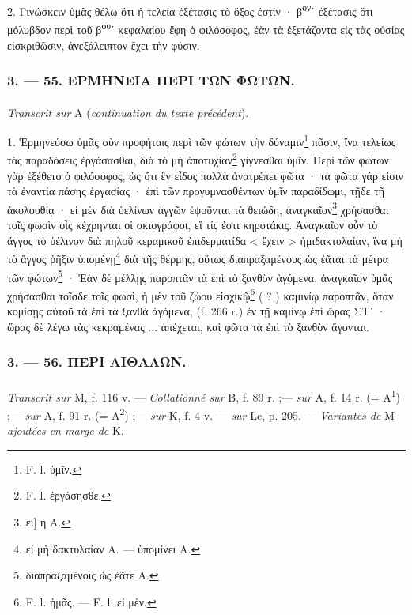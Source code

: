 \documentclass[a4paper, 11pt, oneside, polutonikogreek, french]{article}
\begin{document}
2. Γινώσκειν ὑμᾶς θέλω ὅτι ἡ τελεία ἐξέτασις τὸ ὄξος ἐστίν · β\textsuperscript{ον}ʹ ἐξέτασις ὅτι μόλυβδον περὶ τοῦ β\textsuperscript{ου}ʹ κεφαλαίου ἔφη ὁ φιλόσοφος, ἐὰν τὰ ἐξετάζοντα εἰς τὰς οὐσίας εἰσκριθῶσιν, ἀνεξάλειπτον ἔχει τὴν φύσιν.

\bigskip
\centerline{\EightStarTaper}
\centerline{\EightStarTaper\EightStarTaper}
\bigskip

\subsubsection{3. --- 55. ΕΡΜΗΝΕΙΑ ΠΕΡΙ ΤΩΝ ΦΩΤΩΝ.}
\paragraph{}
\emph{Transcrit sur} A (\emph{continuation du texte précédent}).

\bigskip

1. Ἑρμηνεύσω ὑμᾶς σὺν προφήταις περὶ τῶν φώτων τὴν δύναμιν\footnote{F. l. ὑμῖν.} πᾶσιν, ἵνα τελείως τὰς παραδόσεις ἐργάσασθαι, διὰ τὸ μὴ ἀποτυχίαν\footnote{F. l. ἐργάσησθε.} γίγνεσθαι ὑμῖν. Περὶ τῶν φώτων γὰρ ἐξέθετο ὁ φιλόσοφος, ὡς ὅτι ἓν εἶδος πολλὰ ἀνατρέπει φῶτα · τὰ φῶτα γάρ εἰσιν τὰ ἐναντία πάσης ἐργασίας · ἐπὶ τῶν προγυμνασθέντων ὑμῖν παραδίδωμι, τῇδε τῇ ἀκολουθίᾳ · εἰ μὲν διὰ ὑελίνων ἀγγῶν ἑψοῦνται τὰ θειώδη, ἀναγκαῖον\footnote{εἰ] ἡ A.} χρήσασθαι τοῖς φωσὶν οἷς κέχρηνται οἱ σκιογράφοι, εἴ τίς ἐστι κηροτάκις. Ἀναγκαῖον οὖν τὸ ἄγγος τὸ ὑέλινον διὰ πηλοῦ κεραμικοῦ ἐπιδερματίδα < ἔχειν > ἡμιδακτυλαίαν, ἵνα μὴ τὸ ἄγγος ῥῆξιν ὑπομένῃ\footnote{εἰ μὴ δακτυλαίαν A. --- ὑπομίνει A.} διὰ τῆς θέρμης, οὕτως διαπραξαμένους ὡς ἐᾶται τὰ μέτρα τῶν φώτων\footnote{διαπραξαμένοις ὡς ἐᾶτε A.} · Ἐὰν δὲ μέλλῃς παροπτᾶν τὰ ἐπὶ τὸ ξανθὸν ἀγόμενα, ἀναγκαῖον ὑμᾶς χρήσασθαι τοῖσδε τοῖς φωσὶ, ἡ μὲν τοῦ ζώου εἰσχικῷ\footnote{F. l. ἡμᾶς. --- F. l. εἰ μὲν.} ( ? ) καμινίῳ παροπτᾶν, ὅταν κομίσῃς αὐτοῦ τὰ ἐπὶ τὰ ξανθὰ ἀγόμενα, (f. 266 r.) ἐν τῇ καμίνῳ ἐπὶ ὥρας ΣΤʹ · ὥρας δὲ λέγω τὰς κεκραμένας ... ἀπέχεται, καὶ φῶτα τὰ ἐπὶ τὸ ξανθὸν ἄγονται.

\bigskip
\centerline{\EightStarTaper}
\centerline{\EightStarTaper\EightStarTaper}
\bigskip

\subsubsection{3. --- 56. ΠΕΡΙ ΑΙΘΑΛΩΝ.}
\paragraph{}
\emph{Transcrit sur} M, f. 116 v. --- \emph{Collationné sur} B, f. 89 r. ;--- \emph{sur} A, f. 14 r. (= A\textsuperscript{1}) ;--- \emph{sur} A, f. 91 r. (= A\textsuperscript{2}) ;--- \emph{sur} Κ, f. 4 v. --- \emph{sur} Lc, p. 205. --- \emph{Variantes de} M \emph{ajoutées en marge de} K.
\end{document}

